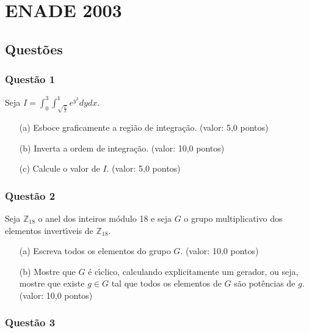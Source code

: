 \chapter{ENADE 2003}

\section{\color{blue} Quest\~oes}

\subsection{\color{blue} Quest\~ao 1}

Seja $I =\displaystyle \int_0 ^3\int_{\sqrt{\frac{x}{3}}}^1 e^{y^3} dydx$.

\begin{enumerate}

\item[(a)] Esboce graficamente a regi\~ao de integra\c c\~ao. (valor: 5,0 pontos)

\item[(b)] Inverta a ordem de integra\c c\~ao. (valor: 10,0 pontos)

\item[(c)] Calcule o valor de $I$. (valor: 5,0 pontos)

\end{enumerate}

\subsection{\color{blue} Quest\~ao 2}

Seja $\mathbb{Z}_{18}$ o anel dos inteiros m\'odulo 18 e seja $G$ o grupo multiplicativo dos elementos invert\'\i veis de $\mathbb{Z}_{18}$.

\begin{enumerate}

\item[(a)] Escreva todos os elementos do grupo $G$. (valor: 10,0 pontos)

\item[(b)] Mostre que $G$ \'e c\'\i clico, calculando explicitamente um gerador, ou seja, mostre que existe $g \in G$ tal que todos os elementos de $G$ s\~ao pot\^encias de $g$. (valor: 10,0 pontos)

\end{enumerate}

\subsection{\color{blue} Quest\~ao 3}

